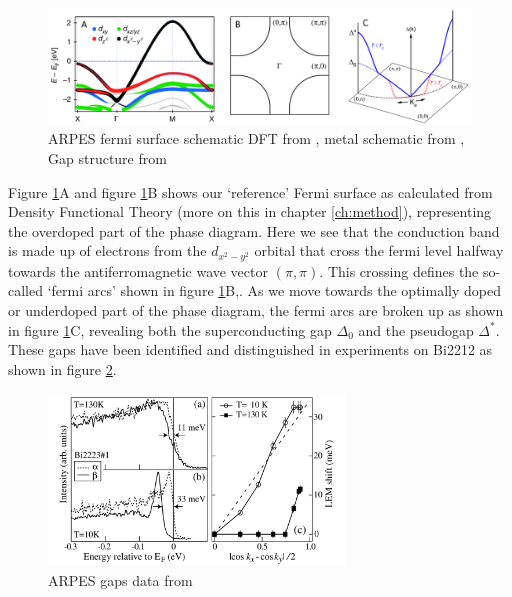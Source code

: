 \begin{figure}
    \centering
    \includegraphics[width=\textwidth]{fig/intro/arpes_fermisurface.png}
    \caption[ARPES fermi surface schematic]{ARPES fermi surface schematic DFT from \cite{Matt2018}, metal schematic from \cite{Damascelli2003}, Gap structure from \cite{Yoshida2011}}
    \label{fig:intro_arpes}
\end{figure}

Figure \ref{fig:intro_arpes}A and figure \ref{fig:intro_arpes}B shows our `reference' Fermi surface as calculated from Density Functional Theory (more on this in chapter \ref{ch:method}), representing the overdoped part of the phase diagram. Here we see that the conduction band is made up of electrons from the $d_{x^2-y^2}$ orbital that cross the fermi level halfway towards the antiferromagnetic wave vector $(\pi,\pi)$. This crossing defines the so-called `fermi arcs' shown in figure \ref{fig:intro_arpes}B,. As we move towards the optimally doped or underdoped part of the phase diagram, the fermi arcs are broken up as shown in figure \ref{fig:intro_arpes}C, revealing both the superconducting gap $\Delta_0$ and the pseudogap $\Delta^*$. These gaps have been identified and distinguished in experiments on Bi2212 as shown in figure \ref{fig:intro_arpes_feng}.

\begin{figure}[]
    \centering
    \includegraphics[width=0.7\textwidth]{fig/intro/arpes_feng.png}
    \caption[ARPES gaps data]{ARPES gaps data from \cite{Feng2002}}
    \label{fig:intro_arpes_feng}
\end{figure}

